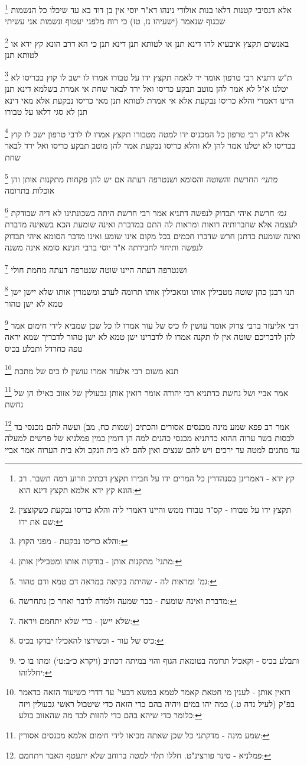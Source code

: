 \documentclass[12pt, openany]{book}
\newcommand{\footnotecomment}[1]{
	\renewcommand\thefootnote{}
	\footnote{#1}}
\newcommand{\commenta}[1]{\footnotecomment{#1}}
\begin{document}
{\commenta{קץ ידא - דאמרינן בסנהדרין כל המרים ידו על חבירו תקצץ דכתיב וזרוע רמה תשבר. רב הונא קץ ידא אלמא תקצץ דינא הוא:}
אלא דנסיבי קטנות דלאו בנות אולודי נינהו דא"ר יוסי אין בן דוד בא עד שיכלו כל הנשמות שבגוף שנאמר (ישעיהו נז, טז) כי רוח מלפני יעטוף ונשמות אני עשיתי
\commenta{תקצץ ידו על טבורו - קס"ד טבורו ממש והיינו דאמרי ליה והלא כריסו נבקעת כשקוצצין שם את ידו:}
באנשים תקצץ איבעיא להו דינא תנן או לטותא תנן דינא תנן כי הא דרב הונא קץ ידא או לטותא תנן 
\commenta{והלא כריסו נבקעת - מפני הקוץ:}
ת"ש דתניא רבי טרפון אומר יד לאמה תקצץ ידו על טבורו אמרו לו ישב לו קוץ בכריסו לא יטלנו א"ל לא אמר להן מוטב תבקע כריסו ואל ירד לבאר שחת 
אי אמרת בשלמא דינא תנן היינו דאמרי והלא כריסו נבקעת אלא אי אמרת לטותא תנן מאי כריסו נבקעת אלא מאי דינא תנן לא סגי דלאו על טבורו 
\commenta{מתני' מתקנות אותן - בודקות אותו ומטבילין אותן:}
אלא ה"ק רבי טרפון כל המכניס ידו למטה מטבורו תקצץ אמרו לו לרבי טרפון ישב לו קוץ בכריסו לא יטלנו אמר להן לא והלא כריסו נבקעת אמר להן מוטב תבקע כריסו ואל ירד לבאר שחת
\commenta{גמ' ומראות לה - שהיתה בקיאה במראה דם טמא ודם טהור:}
{\large\emph{מתני׳}} החרשת והשוטה והסומא ושנטרפה דעתה אם יש להן פקחות מתקנות אותן והן אוכלות בתרומה
\commenta{מדברת ואינה שומעת - כבר שמעה ולמדה לדבר ואחר כן נתחרשה:}
{\large\emph{גמ׳}} חרשת איהי תבדוק לנפשה דתניא אמר רבי חרשת היתה בשכונתינו לא דיה שבודקת לעצמה אלא שחברותיה רואות ומראות לה 
התם במדברת ואינה שומעת הכא בשאינה מדברת ואינה שומעת כדתנן חרש שדברו חכמים בכל מקום אינו שומע ואינו מדבר
הסומא איהי תבדוק לנפשה ותיחזי לחבירתה א"ר יוסי ברבי חנינא סומא אינה משנה
\commenta{שלא יישן - כדי שלא יתחמם ויראה:}
ושנטרפה דעתה היינו שוטה שנטרפה דעתה מחמת חולי 
\commenta{כיס של עור - וכשירצו להאכילו יבדקו בכיס:}
תנו רבנן כהן שוטה מטבילין אותו ומאכילין אותו תרומה לערב ומשמרין אותו שלא יישן ישן טמא לא ישן טהור 
\commenta{ותבלע בכיס - וקאכיל תרומה בטומאת הגוף והוי במיתה דכתיב (ויקרא כ״ב:ט׳) ומתו בו כי יחללוהו:}
רבי אליעזר ברבי צדוק אומר עושין לו כיס של עור אמרו לו כל שכן שמביא לידי חימום אמר להן לדבריכם שוטה אין לו תקנה 
אמרו לו לדברינו ישן טמא לא ישן טהור לדבריך שמא יראה טפה כחרדל ותבלע בכיס 
\commenta{רואין אותן - לענין מי חטאת קאמר לטמא במשא דבעי' עד דדרי כשיעור הזאה כדאמר בפ"ק (לעיל נדה ט.) כמה יהו במים ויהיה בהם כדי הזאה כדי שיטבול ראשי גבעולין ויזה כלומר כדי שיהא בהם כדי להזות לבד מה שהאזוב בולע:}
תנא משום רבי אלעזר אמרו עושין לו כיס של מתכת 
\commenta{שמע מינה - מדקתני כל שכן שאתה מביאו לידי חימום אלמא מכנסים אסורין:}
אמר אביי ושל נחשת כדתניא רבי יהודה אומר רואין אותן גבעולין של אזוב כאילו הן של נחשת 
\commenta{פמלניא - סינר פורצינ"ט. חללו תלוי למטה ברוחב שלא יתעטף האבר ויתחמם:}
אמר רב פפא שמע מינה מכנסים אסורים והכתיב (שמות כח, מב) ועשה להם מכנסי בד לכסות בשר ערוה 
ההוא כדתניא מכנסי כהנים למה הן דומין כמין פמלניא של פרשים למעלה עד מתנים למטה עד ירכים ויש להם שנצים ואין להם לא בית הנקב ולא בית הערוה 
אמר אביי
\clearpage}
\end{document}
